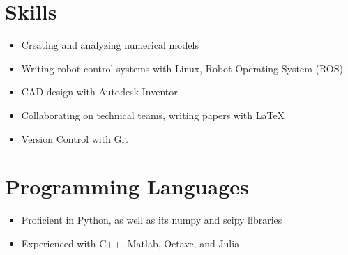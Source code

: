 \documentclass[12pt]{res}
\begin{document}
\begin{resume}
  \vspace{-20pt}
  \section{Skills}
	\vspace{0pt}
	\noindent
	\begin{itemize}
	\item Creating and analyzing numerical models
	\vspace{-10pt}
	\item Writing robot control systems with Linux, Robot Operating System
		(ROS)	
	\vspace{-10pt}
	\item CAD design with Autodesk Inventor
	\vspace{-10pt}
	\item Collaborating on technical teams, writing papers with \LaTeX
	\vspace{-10pt}
	\item Version Control with Git
	\end{itemize}


   \vspace{-10pt}	
   \section{Programming Languages}
	\noindent
	\begin{itemize}
	\item Proficient in Python, as well as its numpy and scipy libraries
	\vspace{-10pt}
	\item Experienced with C++, Matlab, Octave, and Julia
	\end{itemize}

\end{resume}
\end{document}
